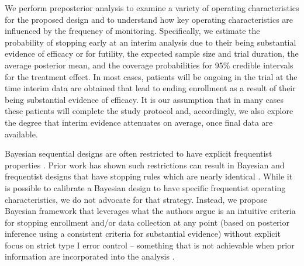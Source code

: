\documentclass[useAMS,usenatbib,referee]{biom}
\begin{document}
We perform preposterior analysis to examine a variety of operating characteristics for the proposed design
and to understand how key operating characteristics are influenced by the frequency of monitoring.
Specifically, we estimate the probability of stopping early at an interim analysis due to their being substantial 
evidence of efficacy or for futility, the expected sample size and trial duration, the average posterior mean, and the coverage probabilities for 95\% credible intervals for the treatment effect. 
In most cases, patients will be ongoing in the trial at the time interim data are obtained that lead to 
ending enrollment as a result of their being substantial evidence of efficacy. 
It is our assumption that in many cases these patients will complete the study protocol and, accordingly, we also explore 
the degree that interim evidence attenuates on average, once final data are available.	

Bayesian sequential designs are often restricted to have explicit frequentist properties \citep{Ventz2015, Zhu2015}. 
Prior work has shown such restrictions can result in Bayesian and frequentist designs that have stopping rules which are 
nearly identical \citep{Stallard2020, Kopp-Schneider2019, Zhu2019}.
While it is possible to calibrate a Bayesian design to have specific frequentist operating characteristics, we do not advocate
for that strategy.
Instead, we propose Bayesian framework that leverages what the authors argue is an intuitive criteria for stopping enrollment 
and/or data collection at any point (based on posterior inference using a consistent criteria for substantial evidence) without 
explicit focus on strict type I error control -- something that is not achievable when prior information are incorporated into 
the analysis \citep{Psioda2018}.
\end{document}
